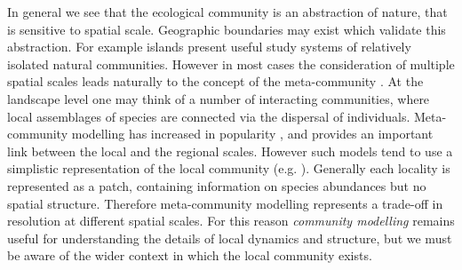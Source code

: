 In general we see that the ecological community is an abstraction of nature, that is sensitive to spatial scale. Geographic boundaries may exist which validate this abstraction. For example islands present useful study systems of relatively isolated natural communities. However in most cases the consideration of multiple spatial scales leads naturally to the concept of the meta-community \cite{leibold2004metacommunity}. At the landscape level one may think of a number of interacting communities, where local assemblages of species are connected via the dispersal of individuals. Meta-community modelling has increased in popularity \cite{leibold2004metacommunity,logue2011empirical}, and provides an important link between the local and the regional scales. However such models tend to use a simplistic representation of the local community (e.g. \cite{klausmeier2001habitat}). Generally each locality is represented as a patch, containing information on species abundances but no spatial structure. Therefore meta-community modelling represents a trade-off in resolution at different spatial scales. For this reason \emph{community modelling} remains useful for understanding the details of local dynamics and structure, but we must be aware of the wider context in which the local community exists. 









